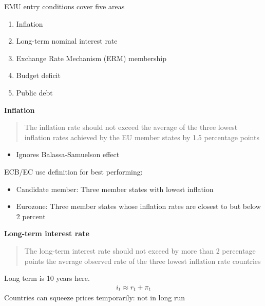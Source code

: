 \documentclass{beamer}
\begin{document}
\begin{frame}
 EMU entry conditions cover five areas
\begin{enumerate}
  \item Inflation
  \item Long-term nominal interest rate
  \item Exchange Rate Mechanism (ERM) membership
  \item Budget deficit
  \item Public debt
\end{enumerate}
\end{frame}

\begin{frame}
  \textbf{Inflation}
  \begin{quote}
    The inflation rate should not exceed the average of the three lowest inflation rates achieved by the EU member states by 1.5 percentage points 
  \end{quote}
  \begin{itemize}
    \item Ignores Balassa-Samuelson effect    
  \end{itemize}
  \medskip
  ECB/EC use definition for best performing:
  \begin{itemize}
    \item Candidate member: Three member states with lowest inflation
    \item Eurozone: Three member states whose inflation rates are closest to but below 2 percent 
  \end{itemize}  
\end{frame}

\begin{frame}
    \textbf{Long-term interest rate}
    \begin{quote}
      The long-term interest rate should not exceed by more than 2 percentage points the average observed rate of the three lowest inflation rate countries
    \end{quote}
    Long term is 10 years here.
  \begin{align}
    i_t \approx r_t + \pi_t
  \end{align}
  \medskip
  Countries can squeeze prices temporarily: not in long run  
\end{frame}
\end{document}
